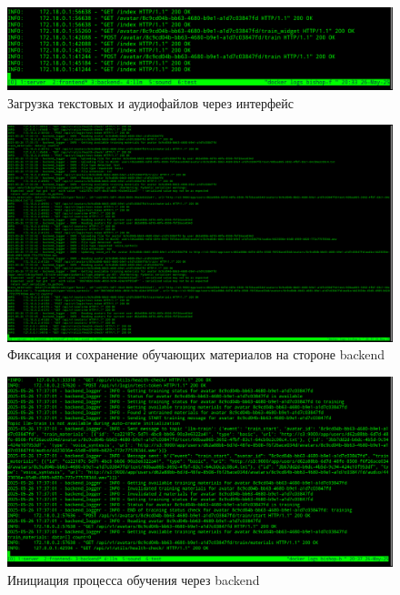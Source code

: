 \begin{figure}
    \centering
    \includegraphics[width=1.0\linewidth]{images/results/fr-upload-materials.png}
    \caption{Загрузка текстовых и аудиофайлов через интерфейс}
    \label{fig:res-fr-upload-materials}
\end{figure}

\begin{figure}
    \centering
    \includegraphics[width=1.0\linewidth]{images/results/bk-upload-materials.png}
    \caption{Фиксация и сохранение обучающих материалов на стороне backend}
    \label{fig:res-bk-upload-materials}
\end{figure}

\begin{figure}
    \centering
    \includegraphics[width=1.0\linewidth]{images/results/bk-start-train.png}
    \caption{Инициация процесса обучения через backend}
    \label{fig:res-bk-start-train}
\end{figure}

